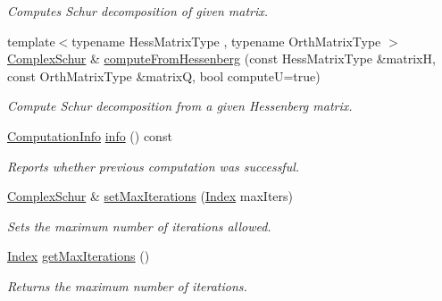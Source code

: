 \begin{DoxyCompactItemize}
\begin{DoxyCompactList}\small\item\em Computes Schur decomposition of given matrix. \end{DoxyCompactList}\item 
{\footnotesize template$<$typename Hess\+Matrix\+Type , typename Orth\+Matrix\+Type $>$ }\\\mbox{\hyperlink{class_eigen_1_1_complex_schur}{Complex\+Schur}} \& \mbox{\hyperlink{class_eigen_1_1_complex_schur_a05dfbf329047aba756a844f8fe2de314}{compute\+From\+Hessenberg}} (const Hess\+Matrix\+Type \&matrixH, const Orth\+Matrix\+Type \&matrixQ, bool computeU=true)
\begin{DoxyCompactList}\small\item\em Compute Schur decomposition from a given Hessenberg matrix. \end{DoxyCompactList}\item 
\mbox{\hyperlink{group__enums_ga85fad7b87587764e5cf6b513a9e0ee5e}{Computation\+Info}} \mbox{\hyperlink{class_eigen_1_1_complex_schur_a8c5ee15fecfd126fc362c3f2fd28f51e}{info}} () const
\begin{DoxyCompactList}\small\item\em Reports whether previous computation was successful. \end{DoxyCompactList}\item 
\mbox{\hyperlink{class_eigen_1_1_complex_schur}{Complex\+Schur}} \& \mbox{\hyperlink{class_eigen_1_1_complex_schur_a6ca227fbd5387f3a625351354b8eec44}{set\+Max\+Iterations}} (\mbox{\hyperlink{class_eigen_1_1_complex_schur_a652104d13723a5b1db2937866a034557}{Index}} max\+Iters)
\begin{DoxyCompactList}\small\item\em Sets the maximum number of iterations allowed. \end{DoxyCompactList}\item 
\mbox{\label{class_eigen_1_1_complex_schur_a2fc0b7bc409a49e7cdb7b6edcfff26eb}} 
\mbox{\hyperlink{class_eigen_1_1_complex_schur_a652104d13723a5b1db2937866a034557}{Index}} \mbox{\hyperlink{class_eigen_1_1_complex_schur_a2fc0b7bc409a49e7cdb7b6edcfff26eb}{get\+Max\+Iterations}} ()
\begin{DoxyCompactList}\small\item\em Returns the maximum number of iterations. \end{DoxyCompactList}\item 
\mbox{\label{class_eigen_1_1_complex_schur_aeaf9ab3a08a463b865a9ac64d2cea592}} 

\end{DoxyCompactItemize}
